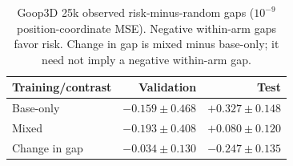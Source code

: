 \begin{table}[!ht]
\centering\small
\setlength{\tabcolsep}{5pt}\renewcommand{\arraystretch}{1.12}
\caption{Goop3D 25k observed risk-minus-random gaps ($10^{-9}$ position-coordinate MSE). Negative within-arm gaps favor risk. Change in gap is mixed minus base-only; it need not imply a negative within-arm gap.}
\label{tab:goop3d25k-observed-position-contrasts}
\begin{tabular}{lrr}
\toprule
Training/contrast & Validation & Test\\
\midrule
Base-only & $-0.159\pm0.468$ & $+0.327\pm0.148$\\
Mixed & $-0.193\pm0.408$ & $+0.080\pm0.120$\\
Change in gap & $-0.034\pm0.130$ & $-0.247\pm0.135$\\
\bottomrule
\end{tabular}
\end{table}
